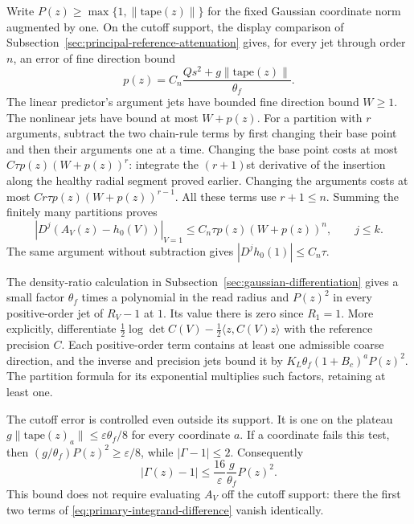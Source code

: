Write $P(z)\ge\max\{1,\|\mathrm{tape}(z)\|\}$ for the fixed
Gaussian coordinate norm augmented by one. On the cutoff support,
the display comparison of Subsection~\ref{sec:principal-reference-attenuation}
gives, for every jet through order $n$, an error of fine direction bound
\[
 p(z)=C_n\frac{Q s^2+g\|\mathrm{tape}(z)\|}{\theta_f}.
\]
The linear predictor's argument jets have bounded fine direction bound
$W\ge1$. The nonlinear jets have bound at most $W+p(z)$.
For a partition with $r$ arguments, subtract the two chain-rule terms
by first changing their base point and then their arguments one at a time.
Changing the base point costs at most
$C\tau p(z)(W+p(z))^r$: integrate the $(r+1)$st derivative of the
insertion along the healthy radial segment proved earlier. Changing the
arguments costs at most
$Cr\tau p(z)(W+p(z))^{r-1}$. All these terms use $r+1\le n$.
Summing the finitely many partitions proves
\[
 |D^j(A_V(z)-h_0(V))|_{V=1}
       \le C_n\tau p(z)(W+p(z))^n,
                         \qquad j\le k.
\]
The same argument without subtraction gives $|D^jh_0(1)|\le C_n\tau$.

The density-ratio calculation in
Subsection~\ref{sec:gaussian-differentiation} gives a small factor
$\theta_f$ times a polynomial in the read radius and $P(z)^2$
in every positive-order jet of $R_V-1$ at $1$.
Its value there is zero since $R_1=1$. More explicitly, differentiate
$\tfrac12\log\det C(V)-\tfrac12\langle z,C(V)z\rangle$
with the reference precision $C$. Each positive-order term contains
at least one admissible coarse direction, and the inverse and precision
jets bound it by $K_L\theta_f(1+B_c)^aP(z)^2$. The partition formula
for its exponential multiplies such factors, retaining at least one.

The cutoff error is controlled even outside its support. It is one on
the plateau $g\|\mathrm{tape}(z)_a\|\le\varepsilon\theta_f/8$
for every coordinate $a$. If a coordinate fails this test, then
$(g/\theta_f)P(z)^2\ge\varepsilon/8$, while $|\Gamma-1|\le2$.
Consequently
\[
 |\Gamma(z)-1|\le \frac{16}{\varepsilon}
                           \frac g{\theta_f}P(z)^2.
\]
This bound does not require evaluating $A_V$ off the cutoff support:
there the first two terms of \eqref{eq:primary-integrand-difference}
vanish identically.

